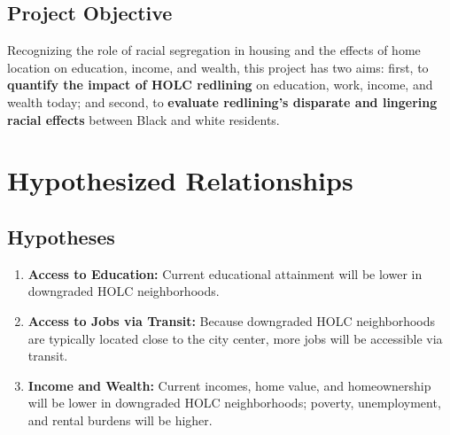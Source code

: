 \documentclass[paper=letter, fontsize=12pt]{scrartcl} %
\begin{document}
\subsection{Project Objective}
Recognizing the role of racial segregation in housing and the effects of home location on education, income, and wealth, this project has two aims: first, to \textbf{quantify the impact of HOLC redlining} on education, work, income, and wealth today; and second, to \textbf{evaluate redlining's disparate and lingering racial effects} between Black and white residents.\par

\section{Hypothesized Relationships}
\subsection{Hypotheses}
\begin{enumerate}
	\item \textbf{Access to Education:} Current educational attainment will be lower in downgraded HOLC neighborhoods.
	\item \textbf{Access to Jobs via Transit:} Because downgraded HOLC neighborhoods are typically located close to the city center, more jobs will be accessible via transit.
	\item \textbf{Income and Wealth:} Current incomes, home value, and homeownership will be lower in downgraded HOLC neighborhoods; poverty, unemployment, and rental burdens will be higher.
\end{enumerate}
\end{document}
